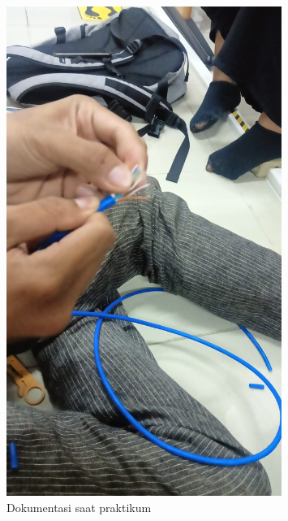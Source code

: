 \begin{figure}
    \centering
    \includegraphics[width=0.8\textwidth]{P1/img/jk1 (3).jpg}
    \caption{Dokumentasi saat praktikum}
    \label{fig:dokumentasi_praktikum_3}
\end{figure}

